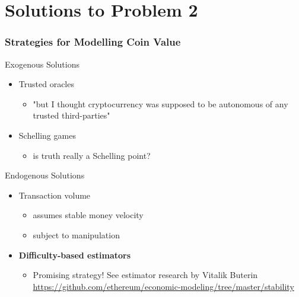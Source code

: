 \documentclass{beamer}
\begin{document}
\section{Solutions to Problem 2}

\begin{frame}
  \frametitle{Strategies for Modelling Coin Value}

  \begin{block}{Exogenous Solutions}

    \begin{itemize}
    \item Trusted oracles
      \begin{itemize}
      \item "but I thought cryptocurrency was supposed to be
        autonomous of any trusted third-parties"
      \end{itemize}
    \item Schelling games
      \begin{itemize}
      \item is truth really a Schelling point?
      \end{itemize}
    \end{itemize}

  \end{block}

  \begin{block}{Endogenous Solutions}

    \begin{itemize}
    \item Transaction volume 
      \begin{itemize}
      \item assumes stable money velocity
      \item subject to manipulation
      \end{itemize}
    \item \textbf{Difficulty-based estimators}
      \begin{itemize}
      \item Promising strategy! See estimator research by Vitalik
        Buterin
        \url{https://github.com/ethereum/economic-modeling/tree/master/stability}
      \end{itemize}
    \end{itemize}

  \end{block}
  
\end{frame}
\end{document}
